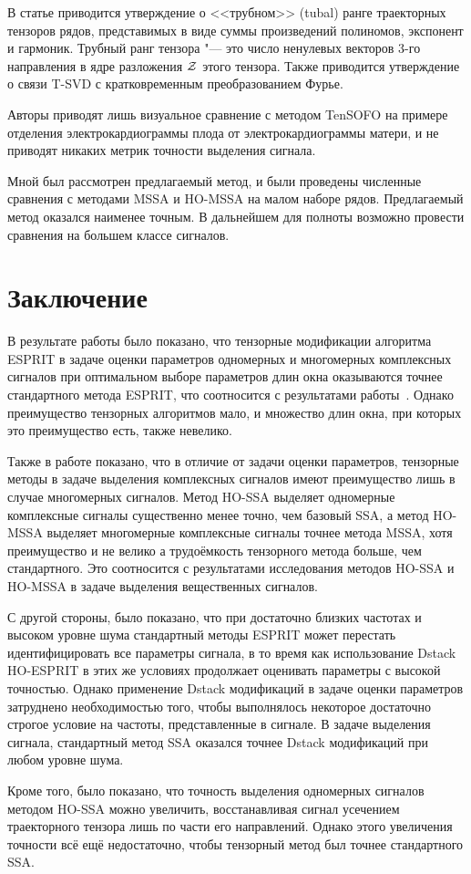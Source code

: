 \documentclass[specialist,
  substylefile=spbu_report.rtx,
subf,href,colorlinks=true, 12pt]{disser}
\theoremstyle{plain}
\theoremstyle{definition}
\theoremstyle{remark}
\begin{document}
В статье приводится утверждение о <<трубном>> (tubal) ранге траекторных
тензоров рядов, представимых в виде суммы произведений полиномов,
экспонент и гармоник.
Трубный ранг тензора "--- это число ненулевых векторов 3-го
направления в ядре разложения $\mathcal{Z}$ этого тензора.
Также приводится утверждение о связи T-SVD с кратковременным
преобразованием Фурье.

Авторы приводят лишь визуальное сравнение с методом TenSOFO на
примере отделения
электрокардиограммы плода от электрокардиограммы матери, и не
приводят никаких метрик точности выделения сигнала.

Мной был рассмотрен предлагаемый метод, и были проведены численные
сравнения с методами MSSA и HO-MSSA на малом наборе рядов.
Предлагаемый метод оказался наименее точным.
В дальнейшем для полноты возможно провести сравнения на большем
классе сигналов.

\newpage

\section{Заключение}\label{sec:conclusion}
В результате работы было показано, что тензорные модификации
алгоритма \linebreak
ESPRIT в задаче оценки параметров одномерных и многомерных
комплексных сигналов при оптимальном выборе параметров
длин окна оказываются точнее стандартного метода ESPRIT,
что соотносится с результатами работы~\cite{hosvd-hooi-separation}.
Однако преимущество тензорных алгоритмов мало, и множество
длин окна, при которых это преимущество есть, также невелико.

Также в работе показано, что в отличие от задачи
оценки параметров, тензорные методы в задаче выделения комплексных
сигналов имеют преимущество лишь в случае многомерных сигналов.
Метод HO-SSA выделяет одномерные комплексные сигналы существенно менее точно,
чем базовый SSA, а метод HO-MSSA выделяет многомерные комплексные сигналы
точнее метода MSSA, хотя преимущество и не велико а трудоёмкость тензорного
метода больше, чем стандартного.
Это соотносится с результатами исследования методов HO-SSA и
HO-MSSA в задаче выделения вещественных сигналов.

С другой стороны, было показано, что при достаточно близких частотах
и высоком уровне шума стандартный методы ESPRIT может перестать
идентифицировать все параметры сигнала, в то время как использование
Dstack HO-ESPRIT в этих же условиях продолжает
оценивать параметры с высокой точностью.
Однако применение Dstack модификаций в задаче оценки параметров
затруднено необходимостью того, чтобы выполнялось некоторое
достаточно строгое условие на частоты, представленные в сигнале.
В задаче выделения сигнала, стандартный метод SSA оказался точнее
Dstack модификаций при любом уровне шума.

Кроме того, было показано, что точность выделения
одномерных сигналов методом HO-SSA можно увеличить, восстанавливая
сигнал усечением траекторного тензора лишь по части его направлений.
Однако этого увеличения точности всё ещё недостаточно, чтобы
тензорный метод был точнее стандартного SSA.



\end{document}
